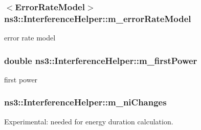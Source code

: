 \subsubsection[{\texorpdfstring{m\+\_\+error\+Rate\+Model}{m_errorRateModel}}]{$<${\bf Error\+Rate\+Model}$>$ ns3\+::\+Interference\+Helper\+::m\+\_\+error\+Rate\+Model\hspace{0.3cm}{\ttfamily [private]}}\hypertarget{classns3_1_1InterferenceHelper_a77201b812b56550608a3f53394868c4e}{}\label{classns3_1_1InterferenceHelper_a77201b812b56550608a3f53394868c4e}


error rate model 

\subsubsection[{\texorpdfstring{m\+\_\+first\+Power}{m_firstPower}}]{\setlength{\rightskip}{0pt plus 5cm}double ns3\+::\+Interference\+Helper\+::m\+\_\+first\+Power\hspace{0.3cm}{\ttfamily [private]}}\hypertarget{classns3_1_1InterferenceHelper_af11d32b96c9e19110deda5cd412574c1}{}\label{classns3_1_1InterferenceHelper_af11d32b96c9e19110deda5cd412574c1}


first power 

\subsubsection[{\texorpdfstring{m\+\_\+ni\+Changes}{m_niChanges}}]{ ns3\+::\+Interference\+Helper\+::m\+\_\+ni\+Changes\hspace{0.3cm}{\ttfamily [private]}}\hypertarget{classns3_1_1InterferenceHelper_adce3da8c009ac49e76c6feb633b82e55}{}\label{classns3_1_1InterferenceHelper_adce3da8c009ac49e76c6feb633b82e55}


Experimental\+: needed for energy duration calculation. 

